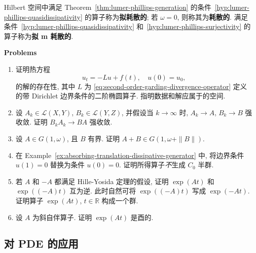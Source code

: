 \begin{Definition}
\label{def:quasidissipative-dissipative-quasi-m}
Hilbert 空间中满足 Theorem~\ref{thm:lumer-phillips-generation} 的条件~\ref{hyp:lumer-phillips-quasidissipativity} 的算子称为\textbf{拟耗散的}; 若 $\omega=0$, 则称其为\textbf{耗散的}. 满足条件~\ref{hyp:lumer-phillips-quasidissipativity} 和~\ref{hyp:lumer-phillips-surjectivity} 的算子称为\textbf{拟 m 耗散的}.
\end{Definition}

\textbf{Problems}

\begin{enumerate}[label=\thesection.\arabic*.,ref=\thesection.\arabic*,start=9,series=book-problems]

\item\label{ex:hille-yosida-heat-dirichlet-existence} 证明热方程\[u_t=-Lu+f(t),\quad u(0)=u_0,\]的解的存在性, 其中 $L$ 为 \eqref{eq:second-order-garding-divergence-operator} 定义的带 Dirichlet 边界条件的二阶椭圆算子. 指明数据和解应属于的空间.

\item\label{ex:strong-operator-products-converge} 设 $A_k\in\mathcal{L}(X,Y)$, $B_k\in\mathcal{L}(Y,Z)$, 并假设当 $k\to\infty$ 时, $A_k\to A$, $B_k\to B$ 强收敛. 证明 $B_kA_k\to BA$ 强收敛.

\item\label{ex:quasicontraction-bounded-operator-perturbation} 设 $A\in G(1,\omega)$, 且 $B$ 有界. 证明 $A+B\in G(1,\omega+\|B\|)$.

\item\label{ex:translation-opposite-boundary-not-generator} 在 Example~\ref{ex:absorbing-translation-dissipative-generator} 中, 将边界条件 $u(1)=0$ 替换为条件 $u(0)=0$. 证明所得算子\emph{不}生成 $C_0$ 半群.

\item\label{ex:opposite-generators-inverse-semigroup-group} 若 $A$ 和 $-A$ 都满足 Hille-Yosida 定理的假设, 证明 $\exp(At)$ 和 $\exp((-A)t)$ 互为逆. 此时自然可将 $\exp((-A)t)$ 写成 $\exp(-At)$. 证明算子 $\exp(At)$, $t\in\mathbb{R}$ 构成一个群.

\item\label{ex:skew-adjoint-semigroup-unitary} 设 $A$ 为斜自伴算子. 证明 $\exp(At)$ 是酉的.

\end{enumerate}

\subsection{对 PDE 的应用}\label{sec:semigroup-pde-applications}

